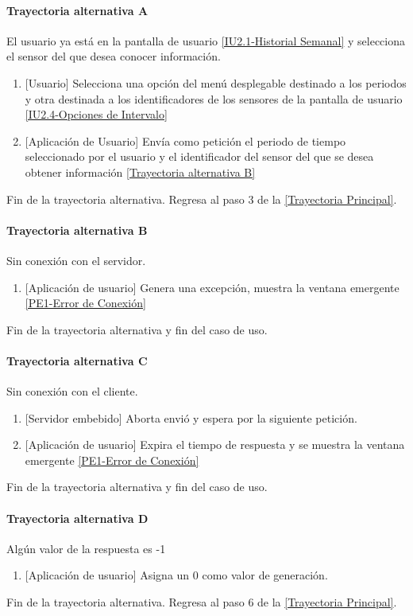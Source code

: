 \paragraph{Trayectoria alternativa A} \label{SUB-U-CU1.3:TA}
    El usuario ya está en la pantalla de usuario \hyperref[fig:Historial Semanal]{[IU2.1-Historial Semanal]} y selecciona el sensor del que desea conocer información.
	\begin{enumerate}[label=A\arabic*.]
	    \item {[Usuario]} Selecciona una opción del menú desplegable destinado a los periodos y otra destinada a los identificadores de los sensores de la pantalla de usuario \hyperref[fig:Opciones de Intervalo]{[IU2.4-Opciones de Intervalo]} 
	    \item {[Aplicación de Usuario]} Envía como petición el periodo de tiempo seleccionado por el usuario y el identificador del sensor del que se desea obtener información \hyperref[SUB-U-CU1.3:TB]{[Trayectoria alternativa B]} 
	\end{enumerate}
	Fin de la trayectoria alternativa. Regresa al paso 3 de la \hyperref[SUB-U-CU1.3:TP]{[Trayectoria Principal]}.
	
\paragraph{Trayectoria alternativa B} \label{SUB-U-CU1.3:TB}
	Sin conexión con el servidor.
	\begin{enumerate}[label=B\arabic*.]
		\item {[Aplicación de usuario]} Genera una excepción, muestra la ventana emergente \hyperref[fig:Error de Conexion]{[PE1-Error de Conexión]}
	\end{enumerate}
	Fin de la trayectoria alternativa y fin del caso de uso.

\paragraph{Trayectoria alternativa C} \label{SUB-U-CU1.3:TC}
	Sin conexión con el cliente.
	\begin{enumerate}[label=C\arabic*.]
		\item {[Servidor embebido]} Aborta envió y espera por la siguiente petición.
		\item {[Aplicación de usuario]} Expira el tiempo de respuesta y se muestra la ventana emergente \hyperref[fig:Error de Conexion]{[PE1-Error de Conexión]}
	\end{enumerate}
	Fin de la trayectoria alternativa y fin del caso de uso.
	
\paragraph{Trayectoria alternativa D} \label{SUB-U-CU1.3:TD}
	Algún valor de la respuesta es -1
	\begin{enumerate}[label=D\arabic*.]
		\item {[Aplicación de usuario]} Asigna un 0 como valor de generación.
	\end{enumerate}
	Fin de la trayectoria alternativa. Regresa al paso 6 de la \hyperref[SUB-U-CU1.3:TP]{[Trayectoria Principal]}.